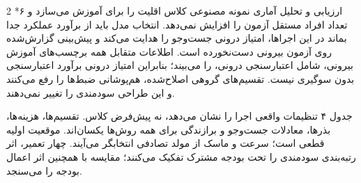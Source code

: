 \documentclass[10pt,a4paper]{article}
\makeatletter
\renewcommand{\section}{\@startsection{section}{1}{0pt}{5pt}{2pt}{\normalfont\normalsize\bfseries}}
\newcommand{\sect}[1]{\section*{#1}}
\makeatother
\begin{document}
\begin{multicols}{2}
\sect{۶  ارزیابی و تحلیل آماری}
 نمونه مصنوعی کلاس اقلیت را برای آموزش می‌سازد \lr{[12]} و تعداد افراد مستقل آزمون را افزایش نمی‌دهد. انتخاب مدل باید از برآورد عملکرد جدا بماند  در این اجراها، امتیاز درونی جست‌وجو را هدایت می‌کند و پیش‌بینی گزارش‌شده روی آزمون بیرونی دست‌نخورده است. اطلاعات متقابل همه برچسب‌های آموزش بیرونی، شامل اعتبارسنجی درونی، را می‌بیند؛ بنابراین امتیاز درونی برآورد اعتبارسنجی بدون سوگیری نیست. تقسیم‌های گروهی اصلاح‌شده، هم‌پوشانی ضبط‌ها را رفع می‌کنند و این طراحی سودمندی را تغییر نمی‌دهند.

جدول ۴ تنظیمات واقعی اجرا را نشان می‌دهد، نه پیش‌فرض کلاس. تقسیم‌ها، هزینه‌ها، بذرها، معادلات جست‌وجو و برازندگی برای همه روش‌ها یکسان‌اند. موقعیت اولیه قطعی است؛ سرعت و ماسک از مولد تصادفی انتخابگر می‌آیند. چهار تعمیر، اثر رتبه‌بندی سودمندی را تحت بودجه مشترک تفکیک می‌کنند؛ مقایسه با  همچنین اثر اعمال بودجه را می‌سنجد.


\end{multicols}
\end{document}
